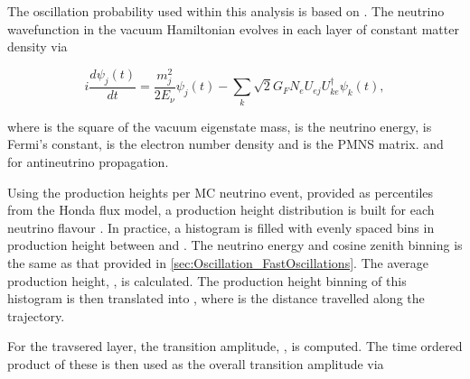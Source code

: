 The oscillation probability used within this analysis is based on \cite{Barger:1980tf}. The neutrino wavefunction in the vacuum Hamiltonian evolves in each layer of constant matter density via

\begin{equation}
  i \frac{d\psi_{j}(t)}{dt} = \frac{m_{j}^{2}}{2E_{\nu}} \psi_{j}(t) - \sum_{k} \sqrt{2} G_{F} N_{e} U_{ej} U_{ke}^{\dagger} \psi_{k}(t),
\end{equation}

where  is the square of the  vacuum eigenstate mass,  is the neutrino energy,  is Fermi's constant,  is the electron number density and  is the PMNS matrix.  and  for antineutrino propagation.

Using the  production heights per MC neutrino event, provided as  percentiles from the Honda flux model, a production height distribution  is built for each neutrino flavour . In practice, a histogram is filled with  evenly spaced bins in production height  between  and . The neutrino energy and cosine zenith binning is the same as that provided in \autoref{sec:Oscillation_FastOscillations}. The average production height, , is calculated. The production height binning of this histogram is then translated into , where  is the distance travelled along the trajectory.

For the  travsered layer, the transition amplitude, , is computed. The time ordered product of these is then used as the overall transition amplitude via

